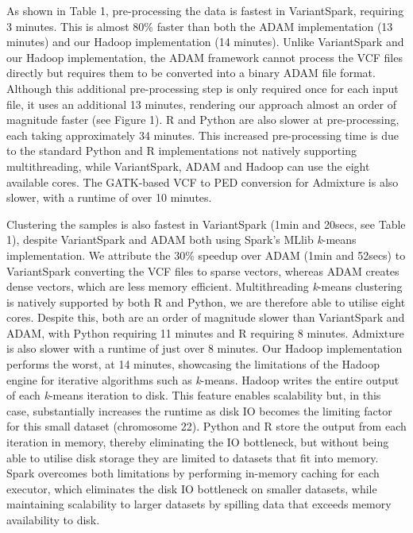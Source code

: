 \documentclass{bmcart}
\newcommand{\variantSpark}{{\sc VariantSpark}}
\newcommand{\kMeans}{\textit{k}-means}
\begin{document}
As shown in Table 1, pre-processing the data is fastest in \variantSpark{}, requiring 3 minutes. %
This is almost 80\% faster than both the {\sc ADAM} implementation (13 minutes) %
and our Hadoop implementation (14 minutes). %
Unlike \variantSpark{} and our Hadoop implementation, the {\sc ADAM} framework cannot process the VCF files directly but requires them to be converted into a binary {\sc ADAM} file format. 
Although this additional pre-processing step is only required once for each input file, it uses an additional 13 minutes, %
rendering our approach almost an order of magnitude faster (see Figure 1).
R and Python are also slower at pre-processing, each taking approximately 34 minutes. %
This increased pre-processing time is due to the standard Python and R implementations not natively supporting multithreading, while \variantSpark{}, {\sc ADAM} and Hadoop can use the eight available cores.
The GATK-based VCF to PED conversion for {\sc Admixture} is also slower, with a runtime of over 10 minutes. 

Clustering the samples is also fastest in \variantSpark{} (1min and 20secs, see Table 1), despite \variantSpark{} and {\sc ADAM} both using {\sc Spark}'s MLlib \kMeans{} implementation. %
We attribute the 30\% speedup over {\sc ADAM} (1min and 52secs) to \variantSpark{} converting the VCF files to sparse vectors, whereas {\sc ADAM} creates dense vectors, which are less memory efficient. %
Multithreading \kMeans{} clustering is natively supported by both R and Python, we are therefore able to utilise eight cores. 
Despite this, both are an order of magnitude slower than \variantSpark{} and {\sc ADAM}, with Python requiring 11 minutes and R requiring 8 minutes. %
{\sc Admixture} is also slower with a runtime of just over 8 minutes. 
Our Hadoop implementation performs the worst, at 14 minutes, showcasing the limitations of the Hadoop engine for iterative algorithms such as \kMeans{}. %
Hadoop writes the entire output of each \kMeans{} iteration to disk. This feature enables scalability but, in this case, substantially increases the runtime as disk IO becomes the limiting factor for this small dataset (chromosome 22).
Python and R store the output from each iteration in memory, thereby eliminating the IO bottleneck, but without being able to utilise disk storage they are limited to datasets that fit into memory.
{\sc Spark} overcomes both limitations by performing in-memory caching for each executor, which eliminates the disk IO bottleneck on smaller datasets, while maintaining scalability to larger datasets by spilling data that exceeds memory availability to disk.
\end{document}
